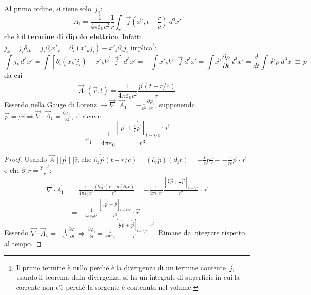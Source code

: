 \documentclass[a4paper]{scrartcl}
\numberwithin{equation}{subsection}
\theoremstyle{style1}
\newenvironment{boxenv}[1][]{
    \begin{eqbox}[#1]
    }{
   \end{eqbox}
}
\begin{document}
Al primo ordine, si tiene solo $\vec{j}_1$:
\begin{equation}
\vec{A}_1 = \frac{1}{4\pi \varepsilon _0 c^2} \frac{1}{r}\int_{\tau } \vec{j}\left(\vec{x}',t-\frac{r}{c}\right)  \ d^3 x'
\end{equation}
che \`e il \textbf{termine di dipolo elettrico}. Infatti $j_k= j_i \delta _{ik} = j_i \partial _i x'_k= \partial _i (x'_k j_i) - x'_k \partial _i j_i$ implica\footnote{Il primo termine \`e nullo perch\'e \`e la divergenza di un termine contente $\vec{j}$, usando il teorema della divergenza, si ha un integrale di superficie in cui la corrente non c'\`e perch\'e la sorgente \`e contenuta nel volume.}:
\[
	\int j_k \ d^3 x' = \int \left[ \partial _i (x_k' j_i) - x'_k \vec{\nabla }\cdot \vec{j}  \right] d^3 x' = -\int x'_k \vec{\nabla }\cdot \vec{j} \ d^3 x' = \int \vec{x}' \frac{\partial \rho }{\partial t} \ d^3 x' = \frac{d }{d t} \int \vec{x}' \rho  \ d^3 x' \equiv \dot{\vec{p}} 
\] 
da cui
\begin{equation}
	 \vec{A}_1(\vec{r},t) = \frac{1}{4\pi \varepsilon _0 c^2}\frac{\dot{\vec{p}}\left(t-r/c\right) }{r}
\end{equation}
Essendo nella Gauge di Lorenz $\to \vec{\nabla }\cdot \vec{A}_1 = -\frac{1}{c^2}\frac{\partial \varphi _1}{\partial t} $, supponendo $\vec{p}=p \hat{z}\Rightarrow \vec{\nabla }\cdot \vec{A}_1 = \frac{\partial A_1}{\partial z} $, si ricava:
\begin{equation}
	\varphi _1 = \frac{1}{4\pi \varepsilon _0}\frac{\left[ \vec{p}+\frac{r}{c}\dot{\vec{p}} \right] _{t - r / c} \cdot \vec{r}}{r^3}
\end{equation}
\begin{boxenv}[]
\begin{proof}
	Usando $\vec{A}  \mid   \mid  \vec{p}  \mid   \mid \hat{z}$, che $\partial _z \dot{\vec{p}}(t - r / c) = (\partial _r \dot{p})(\partial _z r) = -\frac{1}{c}\ddot{p} \frac{z}{r}\equiv -\frac{1}{rc}\ddot{\vec{p}}\cdot \vec{r}$ e che $\partial _z r = \frac{\hat{z}\cdot \vec{r}}{r}$:
	\[
\begin{split}
	\vec{\nabla }\cdot \vec{A}_1 &= \frac{1}{4\pi \varepsilon _0 c^2} \frac{(\partial _z \dot{p})r - \dot{p}(\partial _z r)}{r^2}=-\frac{1}{4\pi \varepsilon _0 c^2}\frac{\left[ \frac{1}{c}\ddot{\vec{p}}+ \frac{1}{r}\dot{\vec{p}}\right]_{t - r / c} }{r^2} \cdot \vec{r}\\
				     &= -\frac{1}{4\pi \varepsilon _0 c^2} \frac{\left[ \frac{r}{c}\ddot{\vec{p}}+ \dot{\vec{p}} \right]_{t- r / c}  }{r^3}\cdot \vec{r}
\end{split}		
	\] 
	Essendo $\vec{\nabla }\cdot \vec{A}_1 = -\frac{1}{c^2}\frac{\partial \varphi _1}{\partial t} \Rightarrow \frac{\partial \varphi _1}{\partial t} = \frac{1}{4\pi \varepsilon _0  } \frac{\left[ \frac{r}{c}\ddot{\vec{p}} + \dot{\vec{p}} \right]_{t - r / c}  \cdot \vec{r}}{r^3}$. Rimane da integrare rispetto al tempo.
\end{proof}
\end{boxenv}
\end{document}
